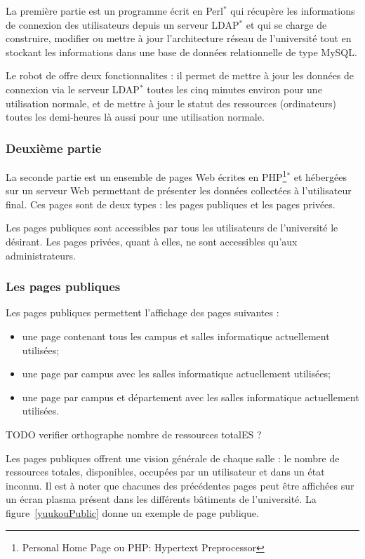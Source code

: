 La premi\`ere partie est un programme \'ecrit en Perl$^*$ qui r\'ecup\`ere les informations de connexion des utilisateurs depuis un serveur LDAP$^*$ et qui se charge de construire, modifier ou mettre \`a jour l'architecture r\'eseau de l'universit\'e tout en stockant les informations dans une base de donn\'ees relationnelle de type MySQL.

Le robot de \Yuukou{} offre deux fonctionnalites : il permet de mettre \`a jour les donn\'ees de connexion via le serveur LDAP$^*$ toutes les cinq minutes environ pour une utilisation normale, et de mettre \`a jour le statut des ressources (ordinateurs) toutes les demi-heures l\`a aussi pour une utilisation normale.

\subsubsection{Deuxi\`eme partie}

La seconde partie est un ensemble de pages Web \'ecrites en PHP\protect\footnote{Personal Home Page ou PHP: Hypertext Preprocessor}$^*$ et h\'eberg\'ees sur un serveur Web permettant de pr\'esenter les donn\'ees collect\'ees \`a l'utilisateur final.
Ces pages sont de deux types : les pages publiques et les pages priv\'ees.

Les pages publiques sont accessibles par tous les utilisateurs de l'universit\'e le d\'esirant.
Les pages priv\'ees, quant \`a elles, ne sont accessibles qu'aux administrateurs.

\subsubsection{Les pages publiques}

\noindent Les pages publiques permettent l'affichage des pages suivantes :
\begin{itemize}
	\item une page contenant tous les campus et salles informatique actuellement utilis\'ees;
	\item une page par campus avec les salles informatique actuellement utilis\'ees;
	\item une page par campus et d\'epartement avec les salles informatique actuellement utilis\'ees.

\end{itemize}

 TODO verifier orthographe nombre de ressources totalES ?

Les pages publiques offrent une vision g\'en\'erale de chaque salle : le nombre de ressources totales, disponibles, occup\'ees par un utilisateur et dans un \'etat inconnu.
Il est \`a noter que chacunes des pr\'ec\'edentes pages peut \^etre affich\'ees sur un \'ecran plasma pr\'esent dans les diff\'erents b\^atiments de l'universit\'e.
La figure~\ref{yuukouPublic} donne un exemple de page publique.

